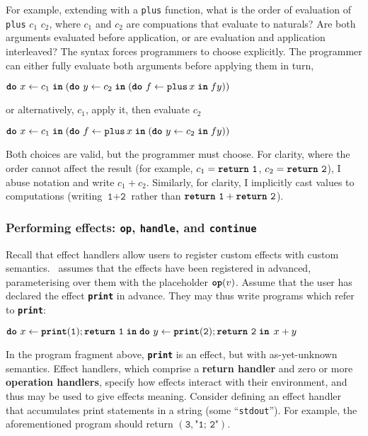 For example, extending \efflang{} with a \texttt{plus} function, what is the order of evaluation of \texttt{plus} $c_1$ $c_2$, where $c_1$ and $c_2$ are compuations that evaluate to naturals? Are both arguments evaluated before application, or are evaluation and application interleaved? The syntax forces programmers to choose explicitly. The programmer can either fully evaluate both arguments before applying them in turn, 
\begin{eff}
$\texttt{\textbf{do}} \,\, {x} \leftarrow {c_1} \; \textbf{\texttt{in}} \; {(\texttt{\textbf{do}} \,\, {y} \leftarrow {c_2} \; \textbf{\texttt{in}} \; {(\texttt{\textbf{do}} \,\, {f} \leftarrow {\texttt{plus} \, x} \; \textbf{\texttt{in}} \; {f y})})}$
\end{eff}
or alternatively, $c_1$, apply it, then evaluate $c_2$
\begin{eff}
$\texttt{\textbf{do}} \,\, {x} \leftarrow {c_1} \; \textbf{\texttt{in}} \; {(\texttt{\textbf{do}} \,\, {f} \leftarrow {\texttt{plus} \, x} \; \textbf{\texttt{in}} \; {(\texttt{\textbf{do}} \,\, {y} \leftarrow {c_2} \; \textbf{\texttt{in}} \; {f y})})}$
\end{eff}

Both choices are valid, but the programmer must choose. For clarity, where the order cannot affect the result (for example, $c_1 = \texttt{\textbf{return}} \,\, {\texttt{1}}$, $c_2 = \texttt{\textbf{return}} \,\, {\texttt{2}}$), I abuse notation and write $c_1+c_2$. Similarly, for clarity, I implicitly cast values to computations (writing $\texttt{1}+\texttt{2}$ rather than $\texttt{\textbf{return}} \,\, {\texttt{1}} + \texttt{\textbf{return}} \,\, {\texttt{2}}$).

\subsubsection{Performing effects: \texttt{op}, \texttt{handle}, and \texttt{continue}}
Recall that effect handlers allow users to register custom effects with custom semantics.\ \efflang{} assumes that the effects have been registered in advanced, parameterising over them with the placeholder $\textbf{\texttt{op}}({v})$. Assume that the user has declared the effect \texttt{\textbf{print}} in advance. They may thus write programs which refer to \texttt{\textbf{print}}:
\begin{eff}
$\texttt{\textbf{do}} \,\, {x} \leftarrow {\texttt{\textbf{print}}(\texttt{1});\texttt{\textbf{return}} \,\, {\texttt{1}}} \; \textbf{\texttt{in}} \; {{\texttt{\textbf{do}} \,\, {y} \leftarrow {\texttt{\textbf{print}}(\texttt{2});\texttt{\textbf{return}} \,\, {\texttt{2}}} \; \textbf{\texttt{in}} \; {\, x + y}}}$
\end{eff}

In the program fragment above, \textbf{\texttt{print}} is an effect, but with as-yet-unknown semantics. Effect handlers, which comprise a \textbf{return handler} and zero or more \textbf{operation handlers}, specify how effects interact with their environment, and thus may be used to give effects meaning. Consider defining an effect handler that accumulates print statements in a string (some ``\texttt{stdout}'').  For example, the aforementioned program should return $(\texttt{3}, \texttt{"1; 2"})$.


